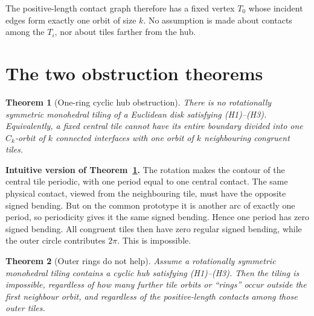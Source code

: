 \documentclass[11pt]{article}
\newtheorem{theorem}{Theorem}
\theoremstyle{definition}
\theoremstyle{remark}
\newcommand{\T}{T}
\begin{document}
The positive-length contact graph therefore has a fixed vertex $\T_0$ whose incident edges form exactly one orbit of size $k$.  No assumption is made about contacts among the $\T_i$, nor about tiles farther from the hub.

\begin{center}
\end{center}

\section{The two obstruction theorems}

\begin{theorem}[One-ring cyclic hub obstruction]\label{thm:one-ring}
There is no rotationally symmetric monohedral tiling of a Euclidean disk satisfying \emph{(H1)--(H3)}.  Equivalently, a fixed central tile cannot have its entire boundary divided into one $C_k$-orbit of $k$ connected interfaces with one orbit of $k$ neighbouring congruent tiles.
\end{theorem}

\begin{plainbox}[boxgreen]
\textbf{Intuitive version of Theorem~\ref{thm:one-ring}.}
The rotation makes the contour of the central tile periodic, with one period equal to one central contact.  The same physical contact, viewed from the neighbouring tile, must have the opposite signed bending.  But on the common prototype it is another arc of exactly one period, so periodicity gives it the same signed bending.  Hence one period has zero signed bending.  All congruent tiles then have zero regular signed bending, while the outer circle contributes $2\pi$.  This is impossible.
\end{plainbox}

\begin{theorem}[Outer rings do not help]\label{thm:many-rings}
Assume a rotationally symmetric monohedral tiling contains a cyclic hub satisfying \emph{(H1)--(H3)}.  Then the tiling is impossible, regardless of how many further tile orbits or ``rings'' occur outside the first neighbour orbit, and regardless of the positive-length contacts among those outer tiles.
\end{theorem}
\end{document}
